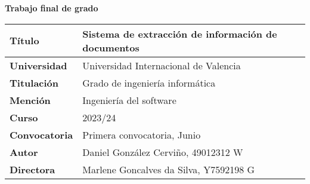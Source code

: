 \noindent
\Huge\textbf{Trabajo final de grado}
\normalfont\normalsize
\vspace{3em}
\begin{table}[h]
    \renewcommand{\arraystretch}{1.5}
    \begin{tabular}{p{} p{}}
        \hline\textbf{Título}       & Sistema de extracción de información de documentos \\
        \hline\textbf{Universidad}  & Universidad Internacional de Valencia              \\
        \hline\textbf{Titulación}   & Grado de ingeniería informática                    \\
        \hline\textbf{Mención}      & Ingeniería del software                            \\
        \hline\textbf{Curso}        & 2023/24                                            \\
        \hline\textbf{Convocatoria} & Primera convocatoria, Junio                        \\
        \hline\textbf{Autor}        & Daniel González Cerviño, 49012312 W                \\
        \hline\textbf{Directora}    & Marlene Goncalves da Silva, Y7592198 G             \\
        \hline
    \end{tabular}
    \label{tab:cober}
\end{table}
